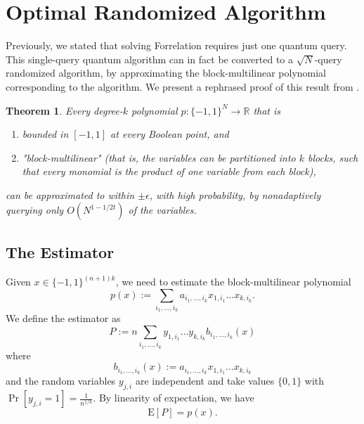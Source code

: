 \documentclass[12pt]{report}
\newtheorem{theorem}{Theorem}
\newcommand{\Exp}{\mathrm{E}}
\begin{document}
\section{Optimal Randomized Algorithm}
Previously, we stated that solving Forrelation requires just one quantum query. This single-query quantum algorithm can in fact be converted to a $\sqrt{N}$-query randomized algorithm, by approximating the block-multilinear polynomial corresponding to the algorithm. We present a rephrased proof of this result from \cite{paper1}.

\begin{theorem}
Every degree-$k$ polynomial $p\colon \{-1,1\}^{N} \rightarrow \mathbb{R}$ that is \begin{enumerate}
    \item bounded in $[-1,1]$ at every Boolean point, and
    \item "block-multilinear" (that is, the variables can be partitioned into $k$ blocks, such that every monomial is the product of one variable from each block),
\end{enumerate} can be approximated to within $\pm \epsilon$, with high probability, by nonadaptively querying only $O\left(N^{1 - 1/2t}\right)$ of the variables.
\end{theorem}



\subsection{The Estimator}
Given $x \in \{-1,1\}^{(n+1)k}$, we need to estimate the block-multilinear polynomial
\begin{equation}
p(x) := \sum_{i_1, \ldots, i_k} a_{i_1, \ldots, i_k} x_{1,i_1} \ldots x_{k,i_k}.
\end{equation}
We define the estimator as
\begin{equation}
P := n\sum_{i_1, \ldots, i_k} y_{1,i_1} \ldots y_{k,i_k} b_{i_1, \ldots, i_k}(x)
\end{equation}
where
\begin{equation}
b_{i_1, \ldots, i_k}(x) := a_{i_1, \ldots, i_k} x_{1,i_1} \dots x_{k,i_k}
\end{equation} and the random variables $y_{j,i}$ are independent and take values $\{0,1\}$ with $\Pr[y_{j,i} = 1] = \frac{1}{n^{1/k}}$. By linearity of expectation, we have
\begin{equation}
\Exp[P] = p(x).
\end{equation}
\end{document}
